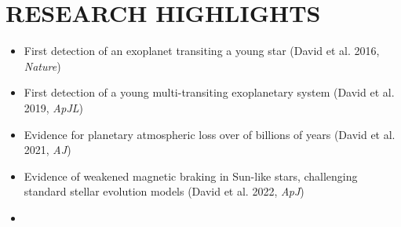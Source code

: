 \section{\large RESEARCH HIGHLIGHTS}
\begin{itemize}
    \item First detection of an exoplanet transiting a young star (David et al. 2016, \textit{Nature})
    \item First detection of a young multi-transiting exoplanetary system (David et al. 2019, \textit{ApJL})
    \item Evidence for planetary atmospheric loss over of billions of years (David et al. 2021, \textit{AJ})
    \item Evidence of weakened magnetic braking in Sun-like stars, challenging standard stellar evolution models (David et al. 2022, \textit{ApJ})
    \item 
\end{itemize}
